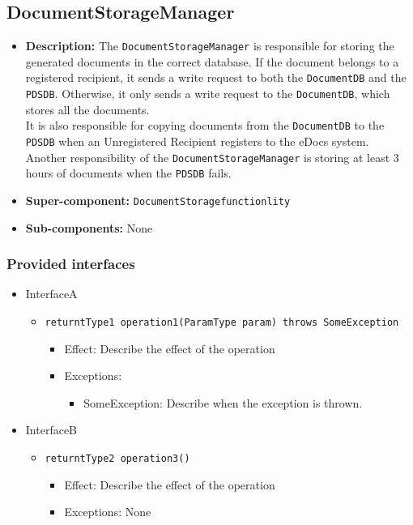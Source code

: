 \documentclass[a4paper,10pt]{article}
\begin{document}
\subsection{DocumentStorageManager}
\begin{itemize}
    \item \textbf{Description:} The \texttt{DocumentStorageManager} is responsible for storing the generated documents in the correct database. If the document belongs to a registered recipient, it sends a write request to both the \texttt{DocumentDB} and the \texttt{PDSDB}. Otherwise, it only sends a write request to the \texttt{DocumentDB}, which stores all the documents.\\
    It is also responsible for copying documents from the \texttt{DocumentDB} to the \texttt{PDSDB} when an Unregistered Recipient registers to the eDocs system.\\ Another responsibility of the \texttt{DocumentStorageManager} is storing at least 3 hours of documents when the \texttt{PDSDB} fails.
    \item \textbf{Super-component:} \texttt{DocumentStoragefunctionlity}
    \item \textbf{Sub-components:} None
\end{itemize}

\subsubsection*{Provided interfaces}
\begin{itemize}
    \item InterfaceA
    \begin{itemize}
        \item \texttt{returntType1 operation1(ParamType param) throws SomeException}
        \begin{itemize}
            \item Effect: Describe the effect of the operation
            \item Exceptions:
            \begin{itemize}
                \item SomeException: Describe when the exception is thrown.
            \end{itemize}
        \end{itemize}
    \end{itemize}

    \item InterfaceB
    \begin{itemize}
        \item \texttt{returntType2 operation3()}
        \begin{itemize}
            \item Effect: Describe the effect of the operation
            \item Exceptions: None
        \end{itemize}
    \end{itemize}
\end{itemize}
\end{document}
